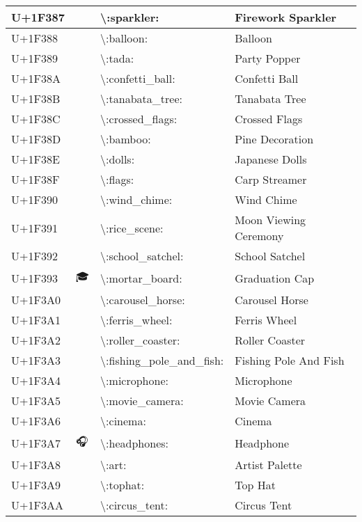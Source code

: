 \begin{table}[h]
\begin{tabulary}{\linewidth}{|L|L|L|L|}
\hline
U+1F387 & 🎇 & {\textbackslash}:sparkler: & Firework Sparkler \\
\hline
U+1F388 & 🎈 & {\textbackslash}:balloon: & Balloon \\
\hline
U+1F389 & 🎉 & {\textbackslash}:tada: & Party Popper \\
\hline
U+1F38A & 🎊 & {\textbackslash}:confetti\_ball: & Confetti Ball \\
\hline
U+1F38B & 🎋 & {\textbackslash}:tanabata\_tree: & Tanabata Tree \\
\hline
U+1F38C & 🎌 & {\textbackslash}:crossed\_flags: & Crossed Flags \\
\hline
U+1F38D & 🎍 & {\textbackslash}:bamboo: & Pine Decoration \\
\hline
U+1F38E & 🎎 & {\textbackslash}:dolls: & Japanese Dolls \\
\hline
U+1F38F & 🎏 & {\textbackslash}:flags: & Carp Streamer \\
\hline
U+1F390 & 🎐 & {\textbackslash}:wind\_chime: & Wind Chime \\
\hline
U+1F391 & 🎑 & {\textbackslash}:rice\_scene: & Moon Viewing Ceremony \\
\hline
U+1F392 & 🎒 & {\textbackslash}:school\_satchel: & School Satchel \\
\hline
U+1F393 & 🎓 & {\textbackslash}:mortar\_board: & Graduation Cap \\
\hline
U+1F3A0 & 🎠 & {\textbackslash}:carousel\_horse: & Carousel Horse \\
\hline
U+1F3A1 & 🎡 & {\textbackslash}:ferris\_wheel: & Ferris Wheel \\
\hline
U+1F3A2 & 🎢 & {\textbackslash}:roller\_coaster: & Roller Coaster \\
\hline
U+1F3A3 & 🎣 & {\textbackslash}:fishing\_pole\_and\_fish: & Fishing Pole And Fish \\
\hline
U+1F3A4 & 🎤 & {\textbackslash}:microphone: & Microphone \\
\hline
U+1F3A5 & 🎥 & {\textbackslash}:movie\_camera: & Movie Camera \\
\hline
U+1F3A6 & 🎦 & {\textbackslash}:cinema: & Cinema \\
\hline
U+1F3A7 & 🎧 & {\textbackslash}:headphones: & Headphone \\
\hline
U+1F3A8 & 🎨 & {\textbackslash}:art: & Artist Palette \\
\hline
U+1F3A9 & 🎩 & {\textbackslash}:tophat: & Top Hat \\
\hline
U+1F3AA & 🎪 & {\textbackslash}:circus\_tent: & Circus Tent \\

\end{tabulary}
\end{table}
